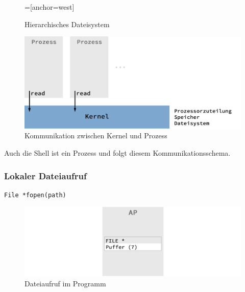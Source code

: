 	\begin{figure}[h]
		\caption{Hierarchisches Dateisystem}
		\begin{center}
			=[anchor=west]
		\end{center}
	\end{figure}

	\begin{figure}[h]
		\caption{Kommunikation zwischen Kernel und Prozess}
		\includegraphics[width=\textwidth]{workfiles/v2_2}
	\end{figure}
	Auch die Shell ist ein Prozess und folgt diesem Kommunikationsschema.\\

	\subsubsection*{Lokaler Dateiaufruf} %
	\label{ssub:dateiaufrufe}
		
		\begin{lstlisting}
File *fopen(path)
		\end{lstlisting}

		\begin{figure}[h]
			\caption{Dateiaufruf im Programm}
			\includegraphics[width=\textwidth]{workfiles/v2_3}
		\end{figure}

